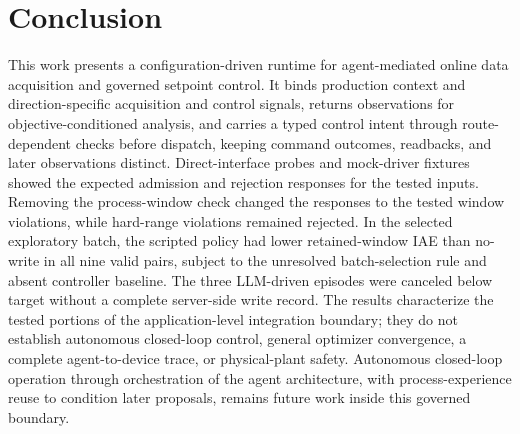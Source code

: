 \section{Conclusion}
\label{sec:conclusion}
This work presents a configuration-driven runtime for agent-mediated online data acquisition and governed setpoint control. It binds production context and direction-specific acquisition and control signals, returns observations for objective-conditioned analysis, and carries a typed control intent through route-dependent checks before dispatch, keeping command outcomes, readbacks, and later observations distinct. Direct-interface probes and mock-driver fixtures showed the expected admission and rejection responses for the tested inputs. Removing the process-window check changed the responses to the tested window violations, while hard-range violations remained rejected. In the selected exploratory batch, the scripted policy had lower retained-window IAE than no-write in all nine valid pairs, subject to the unresolved batch-selection rule and absent controller baseline. The three LLM-driven episodes were canceled below target without a complete server-side write record. The results characterize the tested portions of the application-level integration boundary; they do not establish autonomous closed-loop control, general optimizer convergence, a complete agent-to-device trace, or physical-plant safety. Autonomous closed-loop operation through orchestration of the agent architecture, with process-experience reuse to condition later proposals, remains future work inside this governed boundary.
